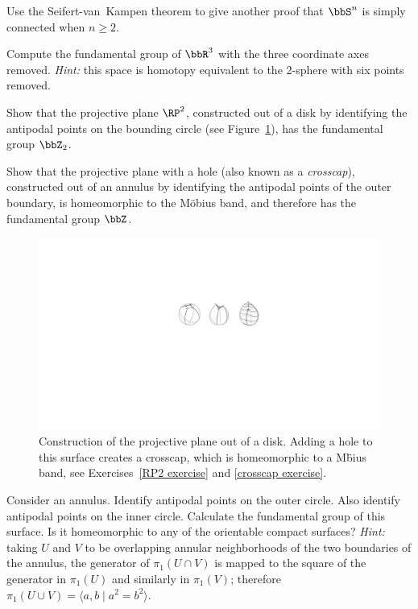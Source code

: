 \begin{xca}{{{\cite[Exercise 10-1]{LeeTop}}}}
    Use the Seifert-van~Kampen theorem to give another proof that $\bbS^n$ is simply connected when $n \geq 2$.
\end{xca}
\begin{xca}{{{\cite[Excercise 10-5]{LeeTop}}}}
    Compute the fundamental group of $\bbR^3$ with the three coordinate axes removed. \emph{Hint:} this space is homotopy equivalent to the 2-sphere with six points removed.
\end{xca}
\begin{xca}\label{RP2 exercise}
    Show that the projective plane $\RP^2$, constructed out of a disk by identifying the antipodal points on the bounding circle (see Figure~\ref{fig:crosscap}), has the fundamental group $\bbZ_2$.
\end{xca}
\begin{xca}[Crosscap]\label{crosscap exercise}
    Show that the projective plane with a hole (also known as a \emph{crosscap}), constructed out of an annulus by identifying the antipodal points of the outer boundary, is homeomorphic to the M\"obius band, and therefore has the fundamental group $\bbZ$.
\end{xca}
\begin{figure}
    \centering
    \includegraphics[scale=0.6]{figures/crosscap.pdf}
    \caption{Construction of the projective plane out of a disk. Adding a hole to this surface creates a crosscap, which is homeomorphic to a M\"bius band, see Exercises~\ref{RP2 exercise} and \ref{crosscap exercise}.}
    \label{fig:crosscap}
\end{figure}
\begin{example}{{{\cite[Exercise III.3]{Bredon}}}}
    Consider an annulus. Identify antipodal points on the outer circle. Also identify antipodal points on the inner circle. Calculate the fundamental group of this surface. Is it homeomorphic to any of the orientable compact surfaces? \emph{Hint:} taking $U$ and $V$ to be overlapping annular neighborhoods of the two boundaries of the annulus, the generator of $\pi_1(U\cap V)$ is mapped to the square of the generator in $\pi_1(U)$ and similarly in $\pi_1(V)$; therefore $\pi_1(U\cup V)=\langle a,b\mid a^2=b^2\rangle$.
\end{example}
